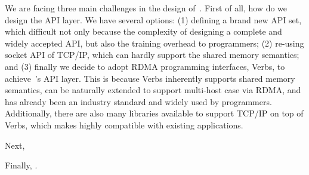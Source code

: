 We are facing three main challenges in the design of~\sysname. First of all, how do we design the API layer. We have several options: (1) defining a brand new API set, which difficult not only because the complexity of designing a complete and widely accepted API, but also the training overhead to programmers; (2) re-using socket API of TCP/IP, which can hardly support the shared memory semantics; and
(3) finally we decide to adopt RDMA programming interfaces, Verbs, to achieve~\sysname's API layer. This is because Verbs inherently supports shared memory semantics, can be naturally extended to support multi-host case via RDMA, and has already been an industry standard and widely used by programmers. Additionally, there are also many libraries available to support TCP/IP on top of Verbs, which makes \sysname highly compatible with existing applications.

Next, 

Finally, .